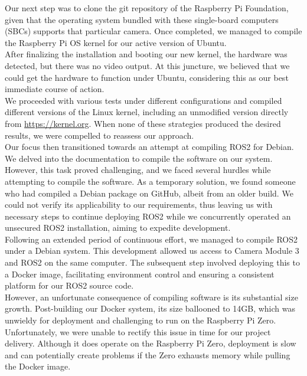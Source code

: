 Our next step was to clone the git repository of the Raspberry Pi Foundation, given that the operating system bundled with these single-board computers (SBCs) supports that particular camera. Once completed, we managed to compile the Raspberry Pi OS kernel for our active version of Ubuntu.\\

After finalizing the installation and booting our new kernel, the hardware was detected, but there was no video output. At this juncture, we believed that we could get the hardware to function under Ubuntu, considering this as our best immediate course of action.\\

We proceeded with various tests under different configurations and compiled different versions of the Linux kernel, including an unmodified version directly from \url{https://kernel.org}. When none of these strategies produced the desired results, we were compelled to reassess our approach.\\

Our focus then transitioned towards an attempt at compiling ROS2 for Debian. We delved into the documentation to compile the software on our system. However, this task proved challenging, and we faced several hurdles while attempting to compile the software. As a temporary solution, we found someone who had compiled a Debian package on GitHub, albeit from an older build. We could not verify its applicability to our requirements, thus leaving us with necessary steps to continue deploying ROS2 while we concurrently operated an unsecured ROS2 installation, aiming to expedite development.\\

Following an extended period of continuous effort, we managed to compile ROS2 under a Debian system. This development allowed us access to Camera Module 3 and ROS2 on the same computer. The subsequent step involved deploying this to a Docker image, facilitating environment control and ensuring a consistent platform for our ROS2 source code.\\

However, an unfortunate consequence of compiling software is its substantial size growth. Post-building our Docker system, its size ballooned to 14GB, which was unwieldy for deployment and challenging to run on the Raspberry Pi Zero. Unfortunately, we were unable to rectify this issue in time for our project delivery. Although it does operate on the Raspberry Pi Zero, deployment is slow and can potentially create problems if the Zero exhausts memory while pulling the Docker image.\\

